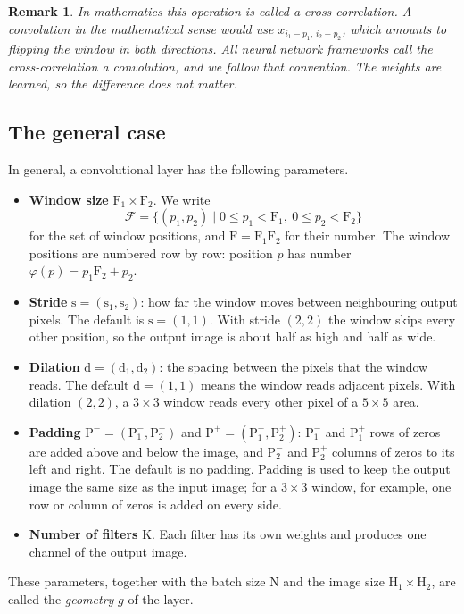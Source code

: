 \documentclass[twoside,11pt]{article}
\newtheorem{remark}{Remark}
\newcommand{\const}[1]{\ensuremath{\mathrm{#1}}} %
\newcommand{\set}[1]{\ensuremath{\{ #1 \} }}     %
\newcommand{\Hin}{\const{H}}         %
\newcommand{\Fs}{\const{F}}          %
\newcommand{\Pb}{\const{P}^{-}}      %
\newcommand{\Pa}{\const{P}^{+}}      %
\newcommand{\cstr}{\const{s}}         %
\newcommand{\dil}{\const{d}}         %
\newcommand{\Pos}{\mathcal{F}}       %
\begin{document}
\begin{remark}
In mathematics this operation is called a \emph{cross-correlation}.
A convolution in the mathematical sense would use $x_{i_1 - p_1,\, i_2 - p_2}$, which amounts to flipping the window in both directions.
All neural network frameworks call the cross-correlation a convolution, and we follow that convention.
The weights are learned, so the difference does not matter.
\end{remark}

\subsection{The general case}
In general, a convolutional layer has the following parameters.
\begin{itemize}
\item \textbf{Window size} $\Fs_1 \times \Fs_2$. We write
  \[
  \Pos = \set{ (p_1, p_2) \mid 0 \leq p_1 < \Fs_1,\ 0 \leq p_2 < \Fs_2 }
  \]
  for the set of window positions, and $\Fs = \Fs_1 \Fs_2$ for their number.
  The window positions are numbered row by row: position $p$ has number $\varphi(p) = p_1 \Fs_2 + p_2$.
\item \textbf{Stride} $\cstr = (\cstr_1, \cstr_2)$: how far the window moves between neighbouring output pixels.
  The default is $\cstr = (1, 1)$.
  With stride $(2, 2)$ the window skips every other position, so the output image is about half as high and half as wide.
\item \textbf{Dilation} $\dil = (\dil_1, \dil_2)$: the spacing between the pixels that the window reads.
  The default $\dil = (1, 1)$ means the window reads adjacent pixels.
  With dilation $(2, 2)$, a $3 \times 3$ window reads every other pixel of a $5 \times 5$ area.
\item \textbf{Padding} $\Pb = (\Pb_1, \Pb_2)$ and $\Pa = (\Pa_1, \Pa_2)$:
  $\Pb_1$ and $\Pa_1$ rows of zeros are added above and below the image, and $\Pb_2$ and $\Pa_2$ columns of zeros to its left and right.
  The default is no padding.
  Padding is used to keep the output image the same size as the input image; for a $3 \times 3$ window, for example, one row or column of zeros is added on every side.
\item \textbf{Number of filters} $\const{K}$. Each filter has its own weights and produces one channel of the output image.
\end{itemize}
These parameters, together with the batch size $\const{N}$ and the image size $\Hin_1 \times \Hin_2$, are called the \emph{geometry} $g$ of the layer.
\end{document}
